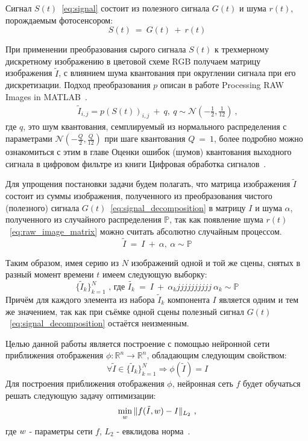 Сигнал $S(t)$~\ref{eq:signal} состоит из полезного сигнала $G(t)$ и шума $r(t)$, порождаемым фотосенсором:
\begin{equation}\label{eq:signal_decomposition}
S(t)\ =\ G(t)\ +\ r(t)
\end{equation}

При применении преобразования сырого сигнала $S(t)$ к трехмерному дискретному изображению в цветовой схеме RGB получаем матрицу изображения  $\tilde{I}$, с влиянием шума квантования при округлении сигнала при его дискретизации. Подход преобразования $p$ описан в работе Processing RAW Images in MATLAB~\autocite{RAWtoRGB}.
\begin{eqnarray}\label{eq:raw_image_matrix}
\tilde{I}_{i,j} = p(S(t))_{i, j}\ +\ q,\ q  \sim \mathcal{N}(-\frac{1}{2}, \frac{1}{12})\ \text{,}
\end{eqnarray}
где $q$, это шум квантования, семплируемый из нормального распределения с параметрами $\mathcal{N}(-\frac{Q}{2}, \frac{Q}{12})$ при шаге квантования $Q\ =\ 1$, более подробно можно ознакомиться с этим в главе Оценки ошибок (шумов) квантования выходного сигнала в цифровом фильтре из книги Цифровая обработка сигналов~\autocite{DSP}.

Для упрощения постановки задачи будем полагать, что матрица изображения $\tilde{I}$ состоит из суммы изображения, полученного из преобразования чистого (полезного) сигнала $G(t)$~\ref{eq:signal_decomposition} в матрицу $I$ и шума $\alpha$, полученного из случайного распределения $\mathbb{P}$, так как появление шума $r(t)$~\ref{eq:raw_image_matrix} можно считать абсолютно случайным процессом.
\begin{equation}\label{eq:matrix_def}
\tilde{I}\ =\ I\ +\ \alpha,\ \alpha \sim \mathbb{P}
\end{equation}

Таким образом, имея серию из $N$ изображений одной и той же сцены, снятых в разный момент времени $t$ имеем следующую выборку:
\begin{equation}\label{eq:collection}
\{\tilde{I}_k\}_{k=1}^{N}\text{ , где }\tilde{I_k}\ =\  I\ +\ \alpha_kjjjjjjjjjj\ \alpha_k \sim \mathbb{P}
\end{equation}
Причём для каждого элемента из набора $\tilde{I}_k$ компонента $I$ является одним и тем же значением, так как при съёмке одной сцены полезный сигнал $G(t)$~\ref{eq:signal_decomposition} остаётся неизменным.

Целью данной работы является построение с помощью нейронной сети приближения отображения $\phi: \mathbb{R}^n \longrightarrow \mathbb{R}^n$, обладающим следующим свойством:
\begin{equation}\label{eq:main_property}
\forall \tilde{I} \in \{\tilde{I}_k\}_{k=1}^{N} \Longrightarrow \phi(\tilde{I}) = I 
\end{equation}
Для построения приближения отображения $\phi$, нейронная сеть $f$ будет обучаться решать следующую задачу оптимизации:
\begin{eqnarray}\label{eq:main_min_task}
\min_{\mathnormal{w}} \Arrowvert f(\tilde{I}, \mathnormal{w}) - I \Arrowvert_{L_2}\text{ ,}
\end{eqnarray}
где $\mathnormal{w}$ - параметры сети $f$, $L_2$ - евклидова норма~\autocite{Haykin}.


